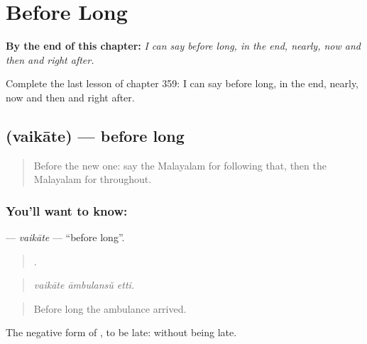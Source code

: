 
\chapter{Before Long}
\label{ch:ml-before-long}

\begin{chapteropening}
\textbf{By the end of this chapter:} \emph{I can say before long, in the end, nearly, now and then and right after.}

Complete the last lesson of chapter 359: I can say before long, in the end, nearly, now and then and right after.
\end{chapteropening}

\section[\texorpdfstring{\ml{വൈകാതെ} (vaikāte)}{വൈകാതെ (vaikāte)}]{ (vaikāte) — before long}

\label{lesson:ML-C359-vaikate}



\begin{quote}
Before the new one: say the Malayalam for following that, then the Malayalam for throughout.
\end{quote}

\subsection*{You'll want to know: }
\textbf{} — \emph{vaikāte} — \textquotedblleft{}before long\textquotedblright{}.

\begin{quote}
  .
\end{quote}

\begin{quote}
\emph{vaikāte āmbulansŭ etti.}
\end{quote}

\begin{quote}
Before long the ambulance arrived.
\end{quote}

The negative form of , to be late: without being late.

